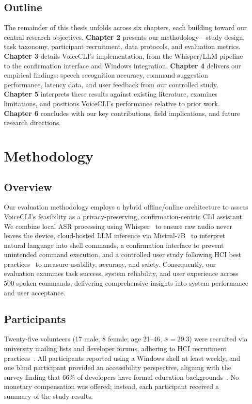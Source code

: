 \documentclass[a4paper,12pt]{article}
\begin{document}
\subsection{Outline}

The remainder of this thesis unfolds across six chapters, each building toward our central research objectives. \textbf{Chapter 2} presents our methodology—study design, task taxonomy, participant recruitment, data protocols, and evaluation metrics. \textbf{Chapter 3} details VoiceCLI's implementation, from the Whisper/LLM pipeline to the confirmation interface and Windows integration. \textbf{Chapter 4} delivers our empirical findings: speech recognition accuracy, command suggestion performance, latency data, and user feedback from our controlled study. \textbf{Chapter 5} interprets these results against existing literature, examines limitations, and positions VoiceCLI's performance relative to prior work. \textbf{Chapter 6} concludes with our key contributions, field implications, and future research directions.

\newpage





\section{Methodology}
\label{sec:method}

\subsection{Overview}
Our evaluation methodology employs a hybrid offline/online architecture to assess VoiceCLI's feasibility as a privacy-preserving, confirmation-centric CLI assistant. We combine local ASR processing using Whisper~\cite{ref10} to ensure raw audio never leaves the device, cloud-hosted LLM inference via Mistral-7B~\cite{ref11} to interpret natural language into shell commands, a confirmation interface to prevent unintended command execution, and a controlled user study following HCI best practices~\cite{ref12,ref4} to measure usability, accuracy, and safety. Consequently, our evaluation examines task success, system reliability, and user experience across 500 spoken commands, delivering comprehensive insights into system performance and user acceptance.

\subsection{Participants}
\noindent Twenty-five volunteers (17 male, 8 female; age 21–46, $\bar{x}=29.3$) were recruited via university mailing lists and developer forums, adhering to HCI recruitment practices~\cite{ref12}. All participants reported using a Windows shell at least weekly, and one blind participant provided an accessibility perspective, aligning with the survey finding that 66\% of developers have formal education backgrounds~\cite{ref2}. No monetary compensation was offered; instead, each participant received a summary of the study results.
\end{document}
